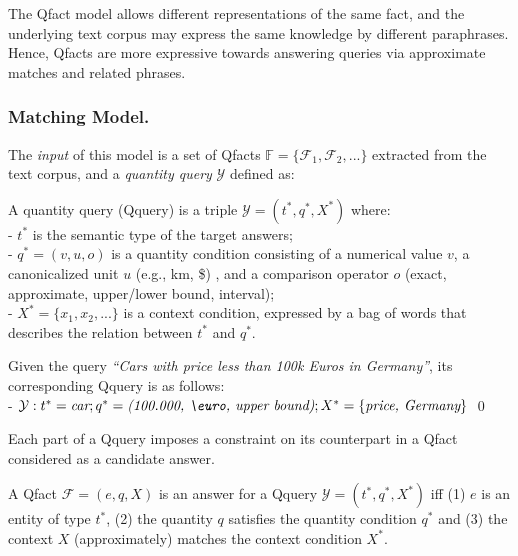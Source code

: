 The Qfact model allows different representations of the same fact,
and the underlying text corpus may express the same 
knowledge by different paraphrases. Hence, 
Qfacts are more expressive towards answering queries
via approximate matches and related phrases.


\subsubsection{Matching Model.}

The \textit{input} of this model is a set of Qfacts $\mathbb{F} =\{\mathcal{F}_1, \mathcal{F}_2, ...\}$
extracted from the text corpus, and  a \textit{quantity query} $\mathcal{Y}$ defined as:


\begin{definition} A quantity query (Qquery) is a triple $\mathcal{Y} = (t^*,q^*,X^*)$ where: \\
- $t^*$ is the semantic type of the target answers;\\
- $q^* = (v,u,o)$ is a quantity condition consisting of a numerical value $v$, a canonicalized unit $u$ 
(e.g., km, \$)
, and a comparison operator $o$ (exact, approximate, upper/lower bound, 
interval);\\
- $X^* = \{x_1,x_2,...\}$ is a context condition, 
expressed by a bag of words that describes the 
relation between $t^*$ and $q^*$.
\end{definition}

\begin{example}
\label{ex:qquery}
Given the query \textit{``Cars with price less than 100k Euros in Germany''}, its corresponding Qquery is  as follows:\\
- $\mathcal{Y} : t^* = \textit{car}; q^*=\textit{(100.000, \euro, upper bound)}; X^* = \{\textit{price, Germany}\}  $
\qed 
\end{example}

Each part of a Qquery imposes a constraint on its 
counterpart in a Qfact considered as a candidate answer.

\begin{definition} 
 A Qfact $ \mathcal{F} =(e,q,X)$ is an answer for a Qquery $\mathcal{Y} = (t^*,q^*,X^*)$ iff 
(1) $e$ is an entity of type $t^*$, 
(2) the quantity $q$ satisfies the quantity condition $q^*$ and (3) the context $X$ (approximately) matches the context condition $X^*$.
\end{definition}

